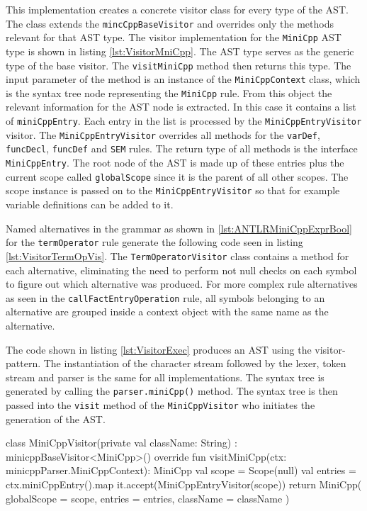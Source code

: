 This implementation creates a concrete visitor class for every type     of the AST. The class extends the \verb|mincCppBaseVisitor| and overrides only the methods relevant for that AST type. The visitor implementation for the \verb|MiniCpp| AST type is shown in listing \ref{lst:VisitorMniCpp}. The AST type serves as the generic type of the base visitor. The \verb|visitMiniCpp| method then returns this type. The input parameter of the method is an instance of the \verb|MiniCppContext| class, which is the syntax tree node representing the \verb|MiniCpp| rule. From this object the relevant information for the AST node is extracted. In this case it contains a list of \verb|miniCppEntry|. Each entry in the list is processed by the \verb|MiniCppEntryVisitor| visitor. The \verb|MiniCppEntryVisitor| overrides all methods for the \verb|varDef|, \verb|funcDecl|, \verb|funcDef| and \verb|SEM| rules. The return type of all methods is the interface \verb|MiniCppEntry|. The root node of the AST is made up of these entries plus the current scope called \verb|globalScope| since it is the parent of all other scopes. The scope instance is passed on to the \verb|MiniCppEntryVisitor| so that for example variable definitions can be added to it.

Named alternatives in the grammar as shown in \ref{lst:ANTLRMiniCppExprBool} for the \verb|termOperator| rule generate the following code seen in listing \ref{lst:VisitorTermOpVis}. The \verb|TermOperatorVisitor| class contains a method for each alternative, eliminating the need to perform not null checks on each symbol to figure out which alternative was produced. For more complex rule alternatives as seen in the \verb|callFactEntryOperation| rule, all symbols belonging to an alternative are grouped inside a context object with the same name as the alternative.

The code shown in listing \ref{lst:VisitorExec} produces an AST using the visitor-pattern. The instantiation of the character stream followed by the lexer, token stream and parser is the same for all implementations. The syntax tree is generated by calling the \verb|parser.miniCpp()| method. The syntax tree is then passed into the \verb|visit| method of the \verb|MiniCppVisitor| who initiates the generation of the AST.




\begin{KotlinCode}[float,numbers=none,caption=Implementation of the \texttt{MiniCppVisitor} class., label=lst:VisitorMniCpp]
class MiniCppVisitor(private val className: String) : minicppBaseVisitor<MiniCpp>() 
{
    override fun visitMiniCpp(ctx: minicppParser.MiniCppContext): MiniCpp {
        val scope = Scope(null)
        val entries = ctx.miniCppEntry().map { it.accept(MiniCppEntryVisitor(scope)) }
        return MiniCpp(
            globalScope = scope,
            entries = entries,
            className = className
        )
    }
}
\end{KotlinCode}


